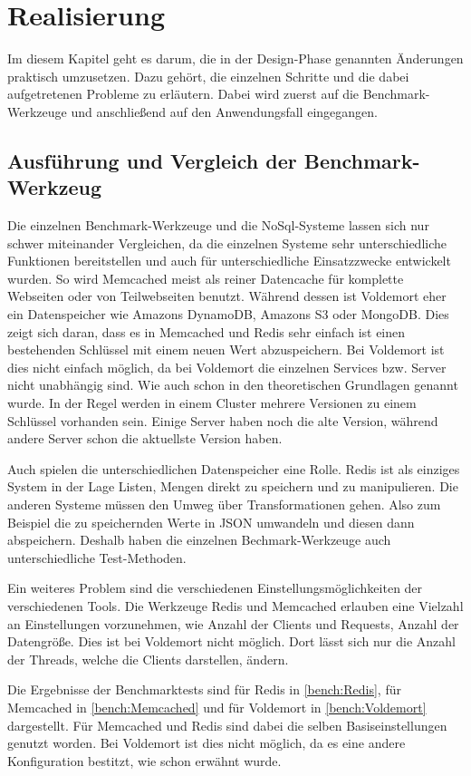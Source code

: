 \chapter{Realisierung}
Im diesem Kapitel geht es darum, die in der Design-Phase genannten Änderungen
praktisch umzusetzen. Dazu gehört, die einzelnen Schritte und die dabei
aufgetretenen Probleme zu erläutern. Dabei wird zuerst auf die
Benchmark-Werkzeuge und anschließend auf den Anwendungsfall eingegangen.

\section{Ausführung und Vergleich der Benchmark-Werkzeug}
Die einzelnen Benchmark-Werkzeuge und die NoSql-Systeme lassen sich nur schwer
miteinander Vergleichen, da die einzelnen Systeme sehr unterschiedliche
Funktionen bereitstellen und auch für unterschiedliche Einsatzzwecke entwickelt
wurden. So wird Memcached meist als reiner Datencache für komplette Webseiten
oder von Teilwebseiten benutzt. Während dessen ist Voldemort eher ein
Datenspeicher wie Amazons DynamoDB, Amazons S3 oder MongoDB. Dies zeigt sich
daran, dass es in Memcached und Redis sehr einfach ist einen bestehenden
Schlüssel mit einem neuen Wert abzuspeichern. Bei Voldemort ist dies nicht
einfach möglich, da bei Voldemort die einzelnen Services bzw. Server nicht
unabhängig sind. Wie auch schon in den theoretischen Grundlagen genannt wurde.
In der Regel werden in einem Cluster mehrere Versionen zu einem Schlüssel
vorhanden sein. Einige Server haben noch die alte Version, während andere Server
schon die aktuellste Version haben.

Auch spielen die unterschiedlichen Datenspeicher eine Rolle. Redis ist als
einziges System in der Lage Listen, Mengen direkt zu speichern und zu
manipulieren. Die anderen Systeme müssen den Umweg über Transformationen gehen.
Also zum Beispiel die zu speichernden Werte in JSON umwandeln und diesen dann
abspeichern. Deshalb haben die einzelnen Bechmark-Werkzeuge auch unterschiedliche
Test-Methoden.

Ein weiteres Problem sind die verschiedenen Einstellungsmöglichkeiten der
verschiedenen Tools. Die Werkzeuge Redis und Memcached erlauben eine Vielzahl
an Einstellungen vorzunehmen, wie Anzahl der Clients und Requests, Anzahl der
Datengröße. Dies ist bei Voldemort nicht möglich. Dort lässt sich nur die Anzahl
der Threads, welche die Clients darstellen, ändern. 

Die Ergebnisse der Benchmarktests sind für Redis in \ref{bench:Redis}, für
Memcached in \ref{bench:Memcached} und für Voldemort in \ref{bench:Voldemort}
dargestellt. Für Memcached und Redis sind dabei die selben Basiseinstellungen
genutzt worden. Bei Voldemort ist dies nicht möglich, da es eine andere
Konfiguration bestitzt, wie schon erwähnt wurde. 

